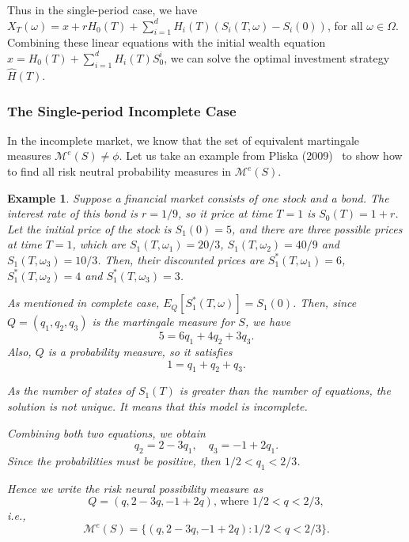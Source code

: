 \documentclass[a4paper]{article}
\newtheorem{exa}{Example}[section]
\theoremstyle{definition}
\numberwithin{equation}{section}
\begin{document}
Thus in the single-period case, we have $X_T(\omega)=x+rH_0(T)+\sum^d_{i=1}H_i(T)(S_i(T,\omega)-S_i(0))$, for all $\omega\in\Omega$. Combining these linear equations with the initial wealth equation $x=H_0(T)+\sum^d_{i=1}H_i(T)S^i_0$, we can solve the optimal investment strategy $\hat H(T)$.

\subsubsection{The Single-period Incomplete Case}
In the incomplete market, we know that the set of equivalent martingale measures $\mathcal M^e(S)\neq\phi$. Let us take an example from Pliska (2009)~\cite{book2} to show how to find all risk neutral probability measures in $\mathcal M^e(S)$.

\begin{exa}\label{incomplete example}
Suppose a financial market consists of one stock and a bond. The interest rate of this bond is $r=1/9$, so it price at time $T=1$ is $S_0(T)=1+r$. Let the initial price of the stock is $S_1(0)=5$, and there are three possible prices at time $T=1$, which are $S_1(T,\omega_1)=20/3$, $S_1(T,\omega_2)=40/9$ and $S_1(T,\omega_3)=10/3$. Then, their discounted prices are  $S^*_1(T,\omega_1)=6$, $S^*_1(T,\omega_2)=4$ and $S^*_1(T,\omega_3)=3$.

As mentioned in complete case, $E_Q[S^*_1(T,\omega)]=S_1(0)$. Then, since $ Q=(q_1,q_2,q_3)$ is the martingale measure for $S$, we have
$$5=6q_1+4q_2+3q_3.$$
Also, $Q$ is a probability measure, so it satisfies
$$1=q_1+q_2+q_3.$$

As the number of states of $S_1(T)$ is greater than the number of equations, the solution is not unique. It means that this model is incomplete.

Combining both two equations, we obtain
$$q_2=2-3q_1,\quad q_3=-1+2q_1.$$
Since the probabilities must be positive, then $1/2<q_1<2/3$.

Hence we write the risk neural possibility measure as
\begin{equation}\nonumber
Q=(q,2-3q,-1+2q)\text{, where }1/2<q<2/3,
\end{equation}
i.e.,
$$\mathcal M^e(S)=\{(q,2-3q,-1+2q): 1/2<q<2/3\}.$$
\end{exa}
\end{document}
